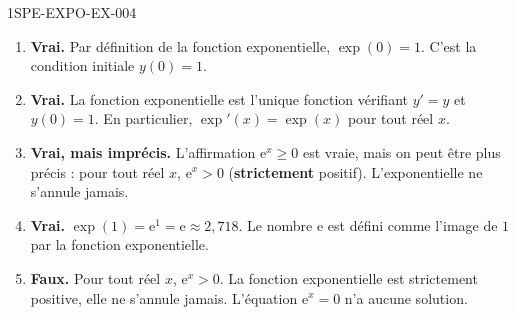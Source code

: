 \begin{corrige}{1SPE-EXPO-EX-004}
\begin{enumerate}
\item \textbf{Vrai.} Par définition de la fonction exponentielle, $\exp(0) = 1$. C'est la condition initiale $y(0) = 1$.

\item \textbf{Vrai.} La fonction exponentielle est l'unique fonction vérifiant $y' = y$ et $y(0) = 1$. En particulier, $\exp'(x) = \exp(x)$ pour tout réel $x$.

\item \textbf{Vrai, mais imprécis.} L'affirmation $\mathrm{e}^x \geqslant 0$ est vraie, mais on peut être plus précis : pour tout réel $x$, $\mathrm{e}^x > 0$ (\textbf{strictement} positif). L'exponentielle ne s'annule jamais.

\item \textbf{Vrai.} $\exp(1) = \mathrm{e}^1 = \mathrm{e} \approx 2{,}718$. Le nombre $\mathrm{e}$ est défini comme l'image de $1$ par la fonction exponentielle.

\item \textbf{Faux.} Pour tout réel $x$, $\mathrm{e}^x > 0$. La fonction exponentielle est strictement positive, elle ne s'annule jamais. L'équation $\mathrm{e}^x = 0$ n'a aucune solution.
\end{enumerate}
\end{corrige}
